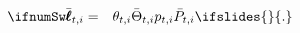 \begin{eqnarray*}
   \ifnumSw  \bar{\pmb{\ell}}_{t,i} & = & \theta_{t,i}\bar{\Theta}_{t,i}{p}_{t,i}\bar{{P}}_{t,i} \label{eq:ellSticky}
\ifslides{}{.}
\end{eqnarray*}
